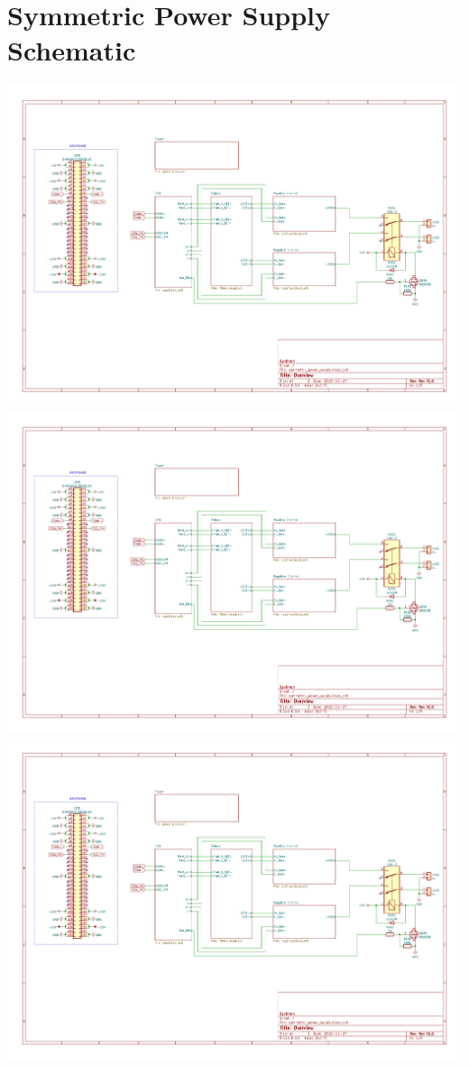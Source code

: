 \documentclass[11pt, a4paper, listof=numbered, captions=tableheading, headinclude, table, xcdraw]{scrreprt}
\begin{document}
\chapter{Symmetric Power Supply Schematic}
\includegraphics[page=1,angle=90,width=\textwidth]{schematics/symmetric_power_supply.pdf}\newpage
\includegraphics[page=2,angle=90,width=\textwidth]{schematics/symmetric_power_supply.pdf}\newpage
\includegraphics[page=3,angle=90,width=\textwidth]{schematics/symmetric_power_supply.pdf}\newpage
\end{document}
